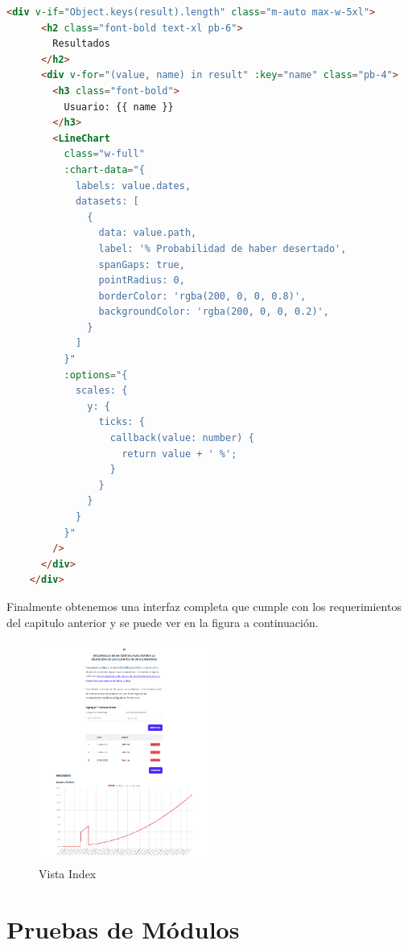 \begin{lstlisting}[language=HTML, caption=crear gráfico en index.vue]
   <div v-if="Object.keys(result).length" class="m-auto max-w-5xl">
      <h2 class="font-bold text-xl pb-6">
        Resultados
      </h2>
      <div v-for="(value, name) in result" :key="name" class="pb-4">
        <h3 class="font-bold">
          Usuario: {{ name }}
        </h3>
        <LineChart
          class="w-full"
          :chart-data="{
            labels: value.dates,
            datasets: [
              {
                data: value.path,
                label: '% Probabilidad de haber desertado',
                spanGaps: true,
                pointRadius: 0,
                borderColor: 'rgba(200, 0, 0, 0.8)',
                backgroundColor: 'rgba(200, 0, 0, 0.2)',
              }
            ]
          }"
          :options="{
            scales: {
              y: {
                ticks: {
                  callback(value: number) {
                    return value + ' %';
                  }
                }
              }
            }
          }"
        />
      </div>
    </div>
\end{lstlisting}	

Finalmente obtenemos una interfaz completa que cumple con los requerimientos del capitulo anterior y se puede ver en la figura a continuación.

\begin{figure}[H]
	\centering \includegraphics[width=0.50\textwidth]{images/2.png}
	\caption{Vista Index}
	\label{fig:ui_end}
\end{figure}

\section{Pruebas de Módulos}

